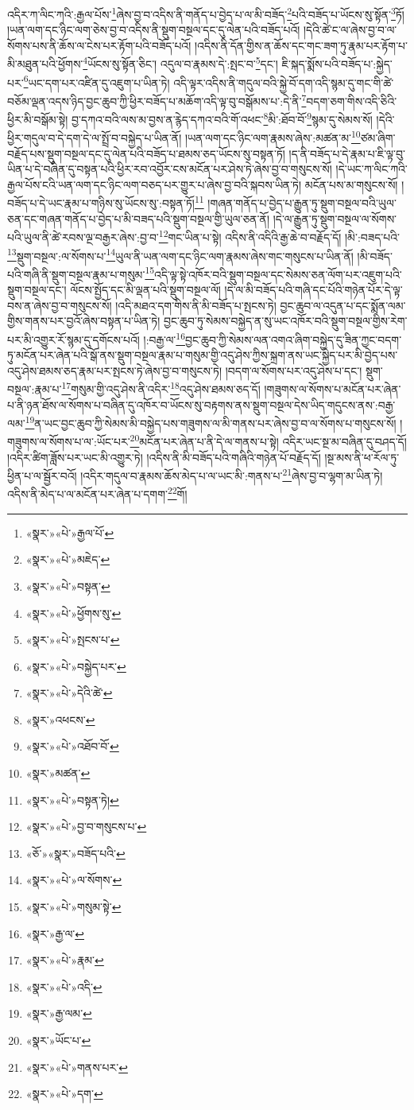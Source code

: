 འདིར་ཀ་ལིང་ཀའི་:རྒྱལ་པོས་\footnote{«སྣར་»«པེ་»རྒྱལ་པོ་}ཞེས་བྱ་བ་འདིས་ནི་གནོད་པ་བྱེད་པ་ལ་མི་བཟོད་\footnote{«སྣར་»«པེ་»མཇེད་}པའི་བཟོད་པ་ཡོངས་སུ་སྟོན་\footnote{«སྣར་»«པེ་»བསྟན་}ཏོ། །ཡན་ལག་དང་ཉིང་ལག་ཅེས་བྱ་བ་འདིས་ནི་སྡུག་བསྔལ་དང་དུ་ལེན་པའི་བཟོད་པའོ། །དེའི་ཚེ་ང་ལ་ཞེས་བྱ་བ་ལ་སོགས་པས་ནི་ཆོས་ལ་ངེས་པར་རྟོག་པའི་བཟོད་པའོ། །འདིས་ནི་དོན་གྱིས་ན་ཆོས་དང་གང་ཟག་ཏུ་རྣམ་པར་རྟོག་པ་མི་མཐུན་པའི་ཕྱོགས་\footnote{«སྣར་»«པེ་»ཕྱོགས་སུ་}ཡོངས་སུ་སྟོན་ཅིང་། འདུལ་བ་རྣམས་དེ་:སྤང་བ་\footnote{«སྣར་»«པེ་»སྤངས་པ་}དང་། ཇི་སྐད་སྨོས་པའི་བཟོད་པ་:སྐྱེད་པར་\footnote{«སྣར་»«པེ་»བསྐྱེད་པར་}ཡང་དག་པར་འཛིན་དུ་འཇུག་པ་ཡིན་ཏེ། འདི་ལྟར་འདིས་ནི་གདུལ་བའི་སྐྱེ་བོ་དག་འདི་སྙམ་དུ་གང་གི་ཚེ་བཅོམ་ལྡན་འདས་ཉིད་བྱང་ཆུབ་ཀྱི་ཕྱིར་བཟོད་པ་མཆོག་འདི་ལྟ་བུ་བསྒོམས་པ་:དེ་ནི་\footnote{«སྣར་»«པེ་»དེའི་ཚེ་}བདག་ཅག་གིས་འདི་ཅིའི་ཕྱིར་མི་བསྒོམ་སྟེ། བྱ་དཀའ་བའི་ལས་མ་བྱས་ན་རྙེད་དཀའ་བའི་གོ་འཕང་\footnote{«སྣར་»འཕངས་}མི་:ཐོབ་བོ་\footnote{«སྣར་»«པེ་»འཐོབ་བོ་}སྙམ་དུ་སེམས་སོ། །དེའི་ཕྱིར་གདུལ་བ་དེ་དག་དེ་ལ་སྤྲོ་བ་བསྐྱེད་པ་ཡིན་ནོ། །ཡན་ལག་དང་ཉིང་ལག་རྣམས་ཞེས་:མཚན་མ་\footnote{«སྣར་»མཚན་}ཙམ་ཞིག་བརྗོད་པས་སྡུག་བསྔལ་དང་དུ་ལེན་པའི་བཟོད་པ་ཐམས་ཅད་ཡོངས་སུ་བསྟན་ཏོ། །ད་ནི་བཟོད་པ་དེ་རྣམ་པ་ཇི་ལྟ་བུ་ཡིན་པ་དེ་བཞིན་དུ་བསྟན་པའི་ཕྱིར་རབ་འབྱོར་ངས་མངོན་པར་ཤེས་ཏེ་ཞེས་བྱ་བ་གསུངས་སོ། །དེ་ཡང་ཀ་ལིང་ཀའི་རྒྱལ་པོས་ངའི་ཡན་ལག་དང་ཉིང་ལག་བཅད་པར་གྱུར་པ་ཞེས་བྱ་བའི་སྐབས་ཡིན་ཏེ། མངོན་པས་མ་གསུངས་སོ། །བཟོད་པ་དེ་ཡང་རྣམ་པ་གཉིས་སུ་ཡོངས་སུ་:བསྟན་ཏོ།\footnote{«སྣར་»«པེ་»བསྟན་ཏེ།} །གཞན་གནོད་པ་བྱེད་པ་རྒྱུན་ཏུ་སྡུག་བསྔལ་བའི་ཡུལ་ཅན་དང་གཞན་གནོད་པ་བྱེད་པ་མི་བཟད་པའི་སྡུག་བསྔལ་གྱི་ཡུལ་ཅན་ནོ། །དེ་ལ་རྒྱུན་ཏུ་སྡུག་བསྔལ་ལ་སོགས་པའི་ཡུལ་ནི་ཚེ་རབས་ལྔ་བརྒྱར་ཞེས་:བྱ་བ་\footnote{«སྣར་»«པེ་»བྱ་བ་གསུངས་པ་}གང་ཡིན་པ་སྟེ། འདིས་ནི་འདིའི་རྒྱ་ཆེ་བ་བརྗོད་དོ། །མི་:བཟད་པའི་\footnote{«ཅོ་»«སྣར་»བཟོད་པའི་}སྡུག་བསྔལ་:ལ་སོགས་པ་\footnote{«སྣར་»«པེ་»ལ་སོགས་}ཡུལ་ནི་ཡན་ལག་དང་ཉིང་ལག་རྣམས་ཞེས་གང་གསུངས་པ་ཡིན་ནོ། །མི་བཟོད་པའི་གཞི་ནི་སྡུག་བསྔལ་རྣམ་པ་གསུམ་\footnote{«སྣར་»«པེ་»གསུམ་སྟེ་}འདི་ལྟ་སྟེ་འཁོར་བའི་སྡུག་བསྔལ་དང་སེམས་ཅན་ལོག་པར་འཇུག་པའི་སྡུག་བསྔལ་དང་། ལོངས་སྤྱོད་དང་མི་ལྡན་པའི་སྡུག་བསྔལ་ལོ། །དེ་ལ་མི་བཟོད་པའི་གཞི་དང་པོའི་གཉེན་པོར་དེ་ལྟ་བས་ན་ཞེས་བྱ་བ་གསུངས་སོ། །འདི་མཐའ་དག་གིས་ནི་མི་བཟོད་པ་སྤངས་ཏེ། བྱང་ཆུབ་ལ་འདུན་པ་དང་སྨོན་ལམ་གྱིས་གནས་པར་བྱའོ་ཞེས་བསྟན་པ་ཡིན་ཏེ། བྱང་ཆུབ་ཏུ་སེམས་བསྐྱེད་ན་སུ་ཡང་འཁོར་བའི་སྡུག་བསྔལ་གྱིས་རེག་པར་མི་འགྱུར་རོ་སྙམ་དུ་དགོངས་པའོ། །:བརྒྱ་ལ་\footnote{«སྣར་»རྒྱ་ལ་}བྱང་ཆུབ་ཀྱི་སེམས་ལན་འགའ་ཞིག་བསྐྱེད་དུ་ཟིན་ཀྱང་བདག་ཏུ་མངོན་པར་ཞེན་པའི་སྒོ་ནས་སྡུག་བསྔལ་རྣམ་པ་གསུམ་གྱི་འདུ་ཤེས་ཀྱིས་སྐྲག་ནས་ཡང་སྐྱེད་པར་མི་བྱེད་པས་འདུ་ཤེས་ཐམས་ཅད་རྣམ་པར་སྤངས་ཏེ་ཞེས་བྱ་བ་གསུངས་ཏེ། །བདག་ལ་སོགས་པར་འདུ་ཤེས་པ་དང་། སྡུག་བསྔལ་:རྣམ་པ་\footnote{«སྣར་»«པེ་»རྣམ་}གསུམ་གྱི་འདུ་ཤེས་ནི་འདིར་\footnote{«སྣར་»«པེ་»འདི་}འདུ་ཤེས་ཐམས་ཅད་དོ། །གཟུགས་ལ་སོགས་པ་མངོན་པར་ཞེན་པ་ནི་ཉན་ཐོས་ལ་སོགས་པ་བཞིན་དུ་འཁོར་བ་ཡོངས་སུ་བརྟགས་ནས་སྡུག་བསྔལ་དེས་ཡིད་གདུངས་ནས་:བརྒྱ་ལམ་\footnote{«སྣར་»རྒྱ་ལམ་}ན་ཡང་བྱང་ཆུབ་ཀྱི་སེམས་མི་བསྐྱེད་པས་གཟུགས་ལ་མི་གནས་པར་ཞེས་བྱ་བ་ལ་སོགས་པ་གསུངས་སོ། །གཟུགས་ལ་སོགས་པ་ལ་:ཡོང་པར་\footnote{«སྣར་»ཡོང་པ་}མངོན་པར་ཞེན་པ་ནི་དེ་ལ་གནས་པ་སྟེ། འདིར་ཡང་སྔ་མ་བཞིན་དུ་བཤད་དོ། །འདིར་ཚིག་ཟློས་པར་ཡང་མི་འགྱུར་ཏེ། །འདིས་ནི་མི་བཟོད་པའི་གཞིའི་གཉེན་པོ་བརྗོད་དོ། །སྔ་མས་ནི་ཕ་རོལ་ཏུ་ཕྱིན་པ་ལ་སྦྱོར་བའོ། །འདིར་གདུལ་བ་རྣམས་ཆོས་མེད་པ་ལ་ཡང་མི་:གནས་པ་\footnote{«སྣར་»«པེ་»གནས་པར་}ཞེས་བྱ་བ་ལྷག་མ་ཡིན་ཏེ། འདིས་ནི་མེད་པ་ལ་མངོན་པར་ཞེན་པ་དགག་\footnote{«སྣར་»«པེ་»དག་}གོ། 